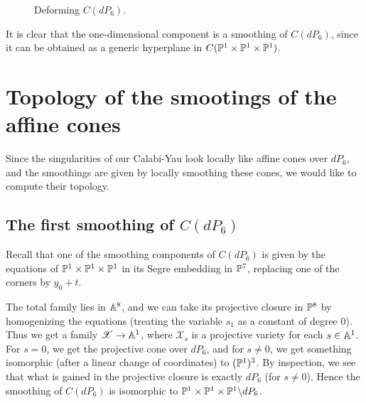 \documentclass[11pt, english]{article}
\begin{document}
\begin{figure}
\centering 
  \caption{Deforming $C(dP_6)$.}
\end{figure}

It is clear that the one-dimensional component is a smoothing of $C(dP_6)$, since it can be obtained as a generic hyperplane in $C(\mathbb{P}^1 \times \mathbb{P}^1 \times \mathbb{P}^1)$.

\section{Topology of the smootings of the affine cones}

Since the singularities of our Calabi-Yau look locally like affine cones over $dP_6$, and the smoothings are given by locally smoothing these cones, we would like to compute their topology. 

\subsection{The first smoothing of $C(dP_6)$}

Recall that one of the smoothing components of $C(dP_6)$ is given by the equations of $\mathbb{P}^1 \times \mathbb{P}^1 \times \mathbb{P}^1$ in its Segre embedding in $\mathbb{P}^7$, replacing one of the corners by $y_0+t$.

The total family lies in $\mathbb{A}^8$, and we can take its projective closure in $\mathbb{P}^8$ by homogenizing the equations (treating the variable $s_1$ as a constant of degree $0$). Thus we get a family $\mathscr X \to \mathbb{A}^1$, where $\mathscr X_s$ is a projective variety for each $s \in \mathbb{A}^1$. For $s=0$, we get the projective cone over $dP_6$, and for $s \neq 0$, we get something isomorphic (after a linear change of coordinates) to $(\mathbb{P}^1)^3$. By inspection, we see that what is gained in the projective closure is exactly $dP_6$ (for $s \neq 0$). Hence the smoothing of $C(dP_6)$ is isomorphic to $\mathbb{P}^1 \times \mathbb{P}^1 \times \mathbb{P}^1 \backslash dP_6$.
\end{document}
